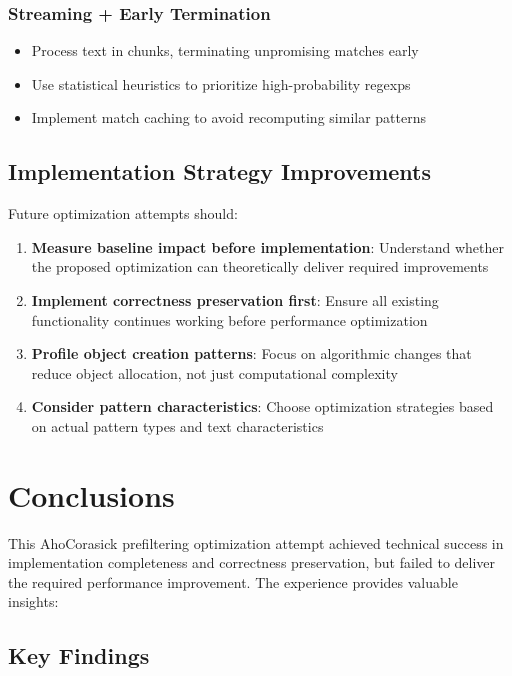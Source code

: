 \documentclass[11pt,a4paper]{article}
\begin{document}
\subsubsection{Streaming + Early Termination}
\begin{itemize}
\item Process text in chunks, terminating unpromising matches early
\item Use statistical heuristics to prioritize high-probability regexps
\item Implement match caching to avoid recomputing similar patterns
\end{itemize}

\subsection{Implementation Strategy Improvements}

Future optimization attempts should:

\begin{enumerate}
\item \textbf{Measure baseline impact before implementation}: Understand whether the proposed optimization can theoretically deliver required improvements
\item \textbf{Implement correctness preservation first}: Ensure all existing functionality continues working before performance optimization
\item \textbf{Profile object creation patterns}: Focus on algorithmic changes that reduce object allocation, not just computational complexity
\item \textbf{Consider pattern characteristics}: Choose optimization strategies based on actual pattern types and text characteristics
\end{enumerate}

\section{Conclusions}

This AhoCorasick prefiltering optimization attempt achieved technical success in implementation completeness and correctness preservation, but failed to deliver the required performance improvement. The experience provides valuable insights:

\subsection{Key Findings}
\end{document}
